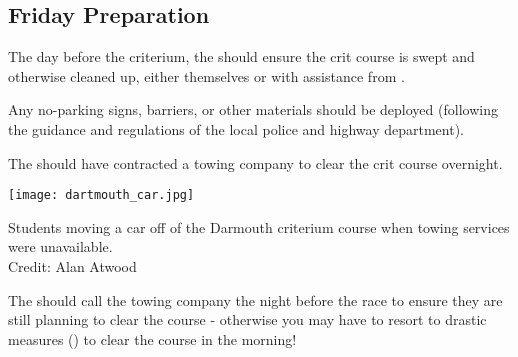 \subsection{Friday Preparation}

The day before the criterium, the  should ensure the crit course is swept and otherwise cleaned up,
either themselves or with assistance from .

Any no-parking signs, barriers, or other materials should be deployed (following the guidance and regulations of the local police and highway department).

The  should have contracted a towing company to clear the crit course overnight.

\begin{marginfigure}
  \texttt{[image: dartmouth\_car.jpg]}
  \caption[Students moving a car off a criterium course]{
            Students moving a car off of the Darmouth criterium course
            when towing services were unavailable.\\
            Credit: Alan Atwood}
\end{marginfigure}

The  should call the towing company the night before the race to ensure they are still planning to clear the course -
otherwise you may have to resort to drastic measures () to clear the course in the morning!
